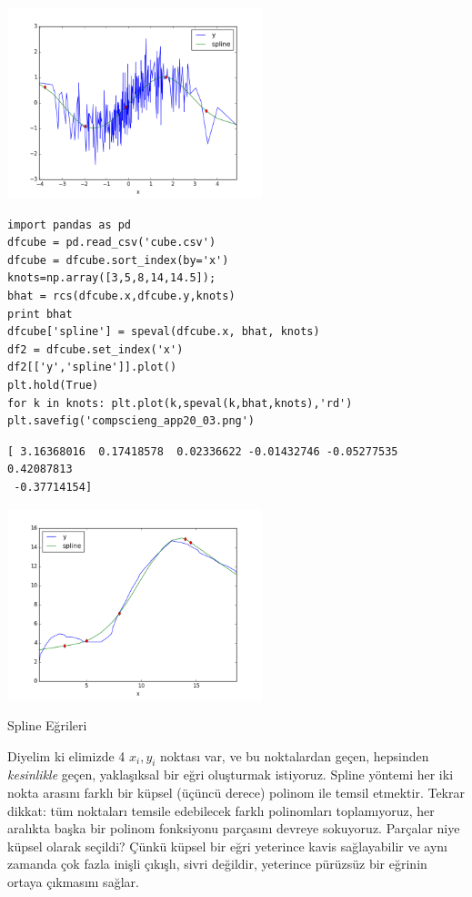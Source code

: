 \documentclass[12pt,fleqn]{article}\usepackage{../../common}
\begin{document}
\includegraphics[width=20em]{compscieng_app20_01.png}

\begin{verbatim}
import pandas as pd
dfcube = pd.read_csv('cube.csv')
dfcube = dfcube.sort_index(by='x')
knots=np.array([3,5,8,14,14.5]);
bhat = rcs(dfcube.x,dfcube.y,knots)
print bhat
dfcube['spline'] = speval(dfcube.x, bhat, knots)
df2 = dfcube.set_index('x')
df2[['y','spline']].plot()
plt.hold(True)
for k in knots: plt.plot(k,speval(k,bhat,knots),'rd')
plt.savefig('compscieng_app20_03.png')
\end{verbatim}

\begin{verbatim}
[ 3.16368016  0.17418578  0.02336622 -0.01432746 -0.05277535  0.42087813
 -0.37714154]
\end{verbatim}

\includegraphics[width=20em]{compscieng_app20_03.png}

Spline Eğrileri

Diyelim ki elimizde 4 $x_i,y_i$ noktası var, ve bu noktalardan geçen,
hepsinden {\em kesinlikle} geçen, yaklaşıksal bir eğri oluşturmak
istiyoruz. Spline yöntemi her iki nokta arasını farklı bir küpsel (üçüncü
derece) polinom ile temsil etmektir. Tekrar dikkat: tüm noktaları temsile
edebilecek farklı polinomları toplamıyoruz, her aralıkta başka bir polinom
fonksiyonu parçasını devreye sokuyoruz. Parçalar niye küpsel olarak
seçildi? Çünkü küpsel bir eğri yeterince kavis sağlayabilir ve aynı zamanda
çok fazla inişli çıkışlı, sivri değildir, yeterince pürüzsüz bir eğrinin
ortaya çıkmasını sağlar.
\end{document}
